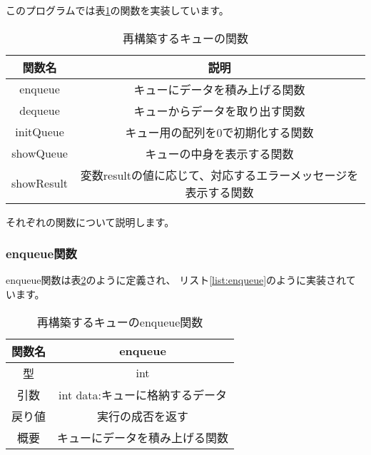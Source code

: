 \documentclass[a4j]{jarticle}
\begin{document}
このプログラムでは表\ref{queuefunc}の関数を実装しています。
\begin{table}[htbp]
  \centering
  \caption{再構築するキューの関数}
  \label{queuefunc}
  \begin{tabular}{|c|c|}
    \hline
    関数名        & 説明                                 \\
    \hline
    enqueue    & キューにデータを積み上げる関数                    \\
    \hline
    dequeue    & キューからデータを取り出す関数                    \\
    \hline
    initQueue  & キュー用の配列を0で初期化する関数                  \\
    \hline
    showQueue  & キューの中身を表示する関数                      \\
    \hline
    showResult & 変数resultの値に応じて、対応するエラーメッセージを表示する関数 \\
    \hline
  \end{tabular}
\end{table}
それぞれの関数について説明します。

\subsubsection{enqueue関数}
enqueue関数は表\ref{table:enqueue}のように定義され、
リスト\ref{list:enqueue}のように実装されています。

\newpage

\begin{table}[htbp]
  \centering
  \caption{再構築するキューのenqueue関数}
  \label{table:enqueue}
  \begin{tabular}{|c|c|}
    \hline
    関数名 & enqueue              \\
    \hline
    型   & int                  \\
    \hline
    引数  & int data:キューに格納するデータ \\
    \hline
    戻り値 & 実行の成否を返す             \\
    \hline
    概要  & キューにデータを積み上げる関数      \\
    \hline
  \end{tabular}
\end{table}
\end{document}
